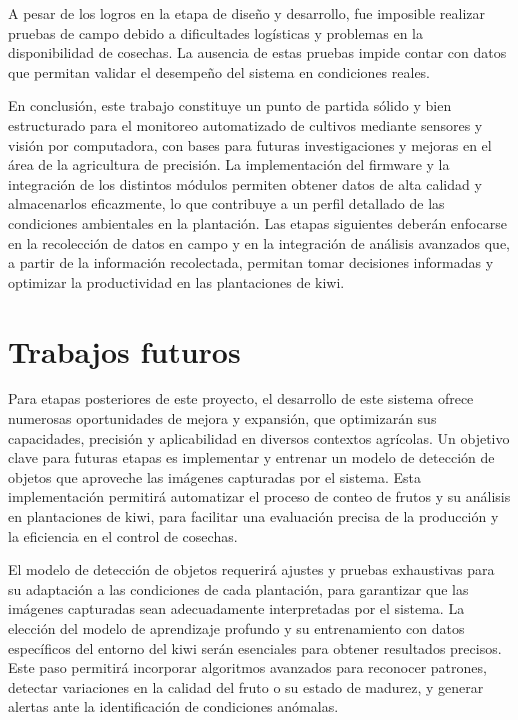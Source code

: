 A pesar de los logros en la etapa de diseño y desarrollo, fue imposible realizar pruebas de campo debido a dificultades logísticas y problemas en la disponibilidad de cosechas. La ausencia de estas pruebas impide contar con datos que permitan validar el desempeño del sistema en condiciones reales.

En conclusión, este trabajo constituye un punto de partida sólido y bien estructurado para el monitoreo automatizado de cultivos mediante sensores y visión por computadora, con bases para futuras investigaciones y mejoras en el área de la agricultura de precisión. La implementación del firmware y la integración de los distintos módulos permiten obtener datos de alta calidad y almacenarlos eficazmente, lo que contribuye a un perfil detallado de las condiciones ambientales en la plantación. Las etapas siguientes deberán enfocarse en la recolección de datos en campo y en la integración de análisis avanzados que, a partir de la información recolectada, permitan tomar decisiones informadas y optimizar la productividad en las plantaciones de kiwi.

\section{Trabajos futuros}

Para etapas posteriores de este proyecto, el desarrollo de este sistema ofrece numerosas oportunidades de mejora y expansión, que optimizarán sus capacidades, precisión y aplicabilidad en diversos contextos agrícolas. Un objetivo clave para futuras etapas es implementar y entrenar un modelo de detección de objetos que aproveche las imágenes capturadas por el sistema. Esta implementación permitirá automatizar el proceso de conteo de frutos y su análisis en plantaciones de kiwi, para facilitar una evaluación precisa de la producción y la eficiencia en el control de cosechas.

El modelo de detección de objetos requerirá ajustes y pruebas exhaustivas para su adaptación a las condiciones de cada plantación, para garantizar que las imágenes capturadas sean adecuadamente interpretadas por el sistema. La elección del modelo de aprendizaje profundo y su entrenamiento con datos específicos del entorno del kiwi serán esenciales para obtener resultados precisos. Este paso permitirá incorporar algoritmos avanzados para reconocer patrones, detectar variaciones en la calidad del fruto o su estado de madurez, y generar alertas ante la identificación de condiciones anómalas.

